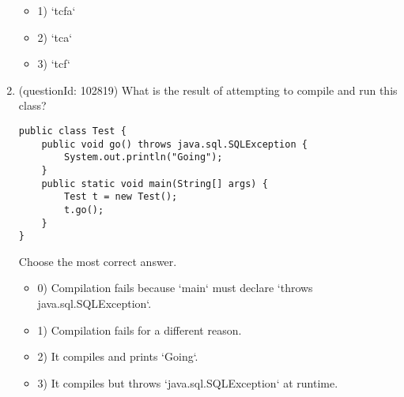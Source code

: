 \documentclass[12pt]{article}
\begin{document}
\begin{enumerate}[label=(\arabic*)]
\begin{itemize}
\item 1) `tcfa`

\item 2) `tca`

\item 3) `tcf`

\end{itemize}
\item (questionId: 102819) What is the result of attempting to compile and run this class?
\begin{verbatim}
public class Test {
    public void go() throws java.sql.SQLException {
        System.out.println("Going");
    }
    public static void main(String[] args) {
        Test t = new Test();
        t.go();
    }
}
\end{verbatim}
Choose the most correct answer. 
\begin{itemize}
\item 0) Compilation fails because `main` must declare `throws java.sql.SQLException`.

\item 1) Compilation fails for a different reason.

\item 2) It compiles and prints `Going`.

\item 3) It compiles but throws `java.sql.SQLException` at runtime.

\end{itemize}

\end{enumerate}
\end{document}
